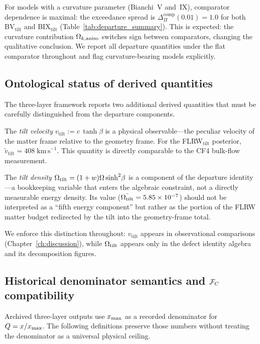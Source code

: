 For models with a curvature parameter (Bianchi~V and~IX),
comparator dependence is maximal: the exceedance spread is
$\Delta_{\Pi}^{\mathrm{comp}}(0.01) = 1.0$ for both
BV$_{\mathrm{tilt}}$ and BIX$_{\mathrm{tilt}}$
(Table~\ref{tab:departure_summary}).  This is expected:
the curvature contribution $\Omega_{k,\mathrm{aniso}}$ switches sign between
comparators, changing the qualitative conclusion.  We report
all departure quantities under the flat comparator throughout
and flag curvature-bearing models explicitly.


\subsection{Ontological status of derived quantities}
\label{sec:ontology}

The three-layer framework reports two additional derived
quantities that must be carefully distinguished from the
departure components.

The \emph{tilt velocity}
$v_{\mathrm{tilt}} := c\,\tanh\beta$ is a physical
observable---the peculiar velocity of the matter frame
relative to the geometry frame.  For the FLRW$_{\mathrm{tilt}}$
posterior,
$\tilde{v}_{\mathrm{tilt}} = 408\;\mathrm{km\,s}^{-1}$.
This quantity is directly comparable to the CF4 bulk-flow
measurement.

The \emph{tilt density} $\Omega_{\mathrm{tilt}} = (1+w)\Omega\sinh^2\!\beta$
is a component of the departure identity---a bookkeeping
variable that enters the algebraic constraint, not a directly
measurable energy density.  Its value
($\tilde{\Omega_{\mathrm{tilt}}} = 5.85 \times 10^{-7}$) should not be
interpreted as a ``fifth energy component'' but rather as the
portion of the FLRW matter budget redirected by the tilt into
the geometry-frame total.

We enforce this distinction throughout: $v_{\mathrm{tilt}}$
appears in observational comparisons
(Chapter~\ref{ch:discussion}), while $\Omega_{\mathrm{tilt}}$ appears only in
the defect identity algebra and its decomposition figures.


\subsection{Historical denominator semantics and
  \texorpdfstring{$\mathcal{F}_C$}{F\_C} compatibility}
\label{sec:ceiling-semantics}

Archived three-layer outputs use $x_{\max}$ as a recorded denominator
for $Q=x/x_{\max}$.  The following definitions preserve those numbers
without treating the denominator as a universal physical ceiling.

